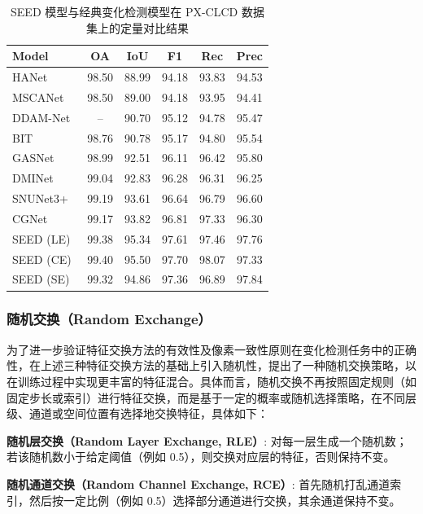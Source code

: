 \begin{table}[!htb]
\centering
\caption{SEED 模型与经典变化检测模型在 PX-CLCD 数据集上的定量对比结果}
\label{tab:seed_pxclcd}
\begin{tabular}{lccccc}
\hline
\textbf{Model} & \textbf{OA} & \textbf{IoU} & \textbf{F1} & \textbf{Rec} & \textbf{Prec} \\
\hline
HANet~\cite{Han2024HANetAH}         & 98.50 & 88.99 & 94.18 & 93.83 & 94.53 \\
MSCANet~\cite{m_liu_cnn-transformer_2022}       & 98.50 & 89.00 & 94.18 & 93.95 & 94.41 \\
DDAM-Net~\cite{feng_ddam-net_2024} & -- & 90.70 & 95.12 & 94.78 & 95.47 \\
BIT~\cite{chen_remote_2022}           & 98.76 & 90.78 & 95.17 & 94.80 & 95.54 \\
GASNet~\cite{zhang_global-aware_2023}    & 98.99 & 92.51 & 96.11 & 96.42 & 95.80 \\
DMINet~\cite{feng_change_2023}         & 99.04 & 92.83 & 96.28 & 96.31 & 96.25 \\
SNUNet3+~\cite{miao_snunet3_2024}     & 99.19 & 93.61 & 96.64 & 96.79 & 96.60 \\
CGNet~\cite{han_change_2023}         & 99.17 & 93.82 & 96.81 & 97.33 & 96.30 \\
\hline
SEED (LE)          & 99.38 & 95.34 & 97.61 & 97.46 & 97.76 \\
SEED (CE)          & 99.40	& 95.50	& 97.70	& 98.07	& 97.33 \\
SEED (SE)          & 99.32 & 94.86 & 97.36 & 96.89 & 97.84 \\
\hline
\end{tabular}
\end{table}

\subsubsection{随机交换（Random Exchange）}
为了进一步验证特征交换方法的有效性及像素一致性原则在变化检测任务中的正确性，在上述三种特征交换方法的基础上引入随机性，提出了一种随机交换策略，以在训练过程中实现更丰富的特征混合。具体而言，随机交换不再按照固定规则（如固定步长或索引）进行特征交换，而是基于一定的概率或随机选择策略，在不同层级、通道或空间位置有选择地交换特征，具体如下：

\textbf{随机层交换（Random Layer Exchange, RLE）}: 对每一层生成一个随机数；若该随机数小于给定阈值（例如 0.5），则交换对应层的特征，否则保持不变。

\textbf{随机通道交换（Random Channel Exchange, RCE）}: 首先随机打乱通道索引，然后按一定比例（例如 0.5）选择部分通道进行交换，其余通道保持不变。

